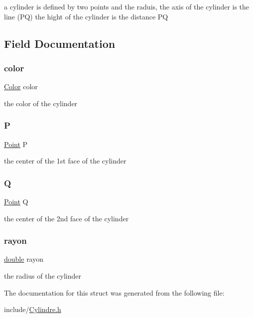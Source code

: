 a cylinder is defined by two points and the raduis, the axis of the cylinder is the line (PQ) the hight of the cylinder is the distance PQ 

\subsection{Field Documentation}
\mbox{\label{struct_cylindre_aa5f4d1eda21c196bd8401ff73f105073}} 
\subsubsection{\texorpdfstring{color}{color}}
{\footnotesize\ttfamily \hyperlink{struct_color}{Color} color}

the color of the cylinder \mbox{\label{struct_cylindre_a8c362b40598e0f5315cbcd092760c0d2}} 
\subsubsection{\texorpdfstring{P}{P}}
{\footnotesize\ttfamily \hyperlink{struct_point}{Point} P}

the center of the 1st face of the cylinder \mbox{\label{struct_cylindre_a20c58d187415dcf2911db42e12d5ee05}} 
\subsubsection{\texorpdfstring{Q}{Q}}
{\footnotesize\ttfamily \hyperlink{struct_point}{Point} Q}

the center of the 2nd face of the cylinder \mbox{\label{struct_cylindre_a2459aedac9f8646ad9566164a9a83f41}} 
\subsubsection{\texorpdfstring{rayon}{rayon}}
{\footnotesize\ttfamily \hyperlink{g3x__transfo_8h_a89b2b23e407882a535d835574a7912e1}{double} rayon}

the radius of the cylinder 

The documentation for this struct was generated from the following file\+:\begin{DoxyCompactItemize}
\item 
include/\hyperlink{_cylindre_8h}{Cylindre.\+h}\end{DoxyCompactItemize}
